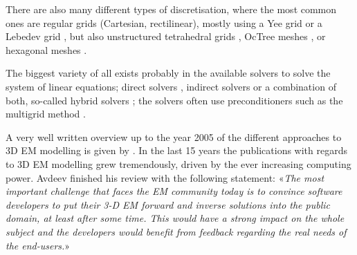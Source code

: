 \documentclass[
    paper,
  ]{geophysics}
\begin{document}
There are also many different types of discretisation, where the most common
ones are regular grids (Cartesian, rectilinear), mostly using a Yee grid
\citep{IEEE.66.Yee} or a Lebedev grid \citep{CMMP.64.Lebedev}, but also
unstructured tetrahedral grids \citep{SEG.16.Zhang, CAG.17.Cai}, OcTree meshes
\citep{ECP.07.Haber}, or hexagonal meshes \citep{CAG.14.Cai}.

The biggest variety of all exists probably in the available solvers to solve
the system of linear equations; direct solvers \citep{GEO.09.Streich,
GEO.15.Grayver, GP.14.Chung, GEO.14.Jaysaval, SEG.15.Oh, GJI.18.Wang}, indirect
solvers \citep{GP.06.Mulder, GJI.15.Jaysaval} or a combination of both,
so-called hybrid solvers \citep{GEO.18.Liu}; the solvers often use
preconditioners such as the multigrid method \citep{SIAM.02.Aruliah,
GP.06.Mulder, GJI.16.Jaysaval}.

A very well written overview up to the year 2005 of the different approaches to
3D EM modelling is given by \cite{SG.05.Avdeev}. In the last 15 years the
publications with regards to 3D EM  modelling grew tremendously, driven
by the ever increasing computing power. Avdeev finished his review with the
following statement: «\emph{The most important challenge that faces the EM
community today is to convince software developers to put their 3-D EM forward
and inverse solutions into the public domain, at least after some time. This
would have a strong impact on the whole subject and the developers would
benefit from feedback regarding the real needs of the end-users.}»
\end{document}

